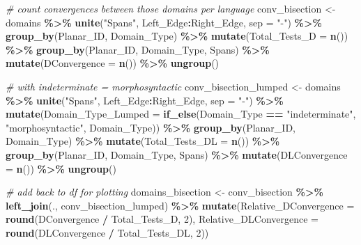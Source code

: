 \documentclass[
]{article}
\newenvironment{Shaded}{\begin{snugshade}}{\end{snugshade}}
\newcommand{\AttributeTok}[1]{\textcolor[rgb]{0.13,0.29,0.53}{#1}}
\newcommand{\CommentTok}[1]{\textcolor[rgb]{0.56,0.35,0.01}{\textit{#1}}}
\newcommand{\DecValTok}[1]{\textcolor[rgb]{0.00,0.00,0.81}{#1}}
\newcommand{\FunctionTok}[1]{\textcolor[rgb]{0.13,0.29,0.53}{\textbf{#1}}}
\newcommand{\NormalTok}[1]{#1}
\newcommand{\OtherTok}[1]{\textcolor[rgb]{0.56,0.35,0.01}{#1}}
\newcommand{\SpecialCharTok}[1]{\textcolor[rgb]{0.81,0.36,0.00}{\textbf{#1}}}
\newcommand{\StringTok}[1]{\textcolor[rgb]{0.31,0.60,0.02}{#1}}
\begin{document}
\begin{Shaded}
\begin{Highlighting}[]
\CommentTok{\# count convergences between those domains per language}
\NormalTok{conv\_bisection }\OtherTok{\textless{}{-}}\NormalTok{ domains }\SpecialCharTok{\%\textgreater{}\%}
  \FunctionTok{unite}\NormalTok{(}\StringTok{"Spans"}\NormalTok{, Left\_Edge}\SpecialCharTok{:}\NormalTok{Right\_Edge, }\AttributeTok{sep =} \StringTok{"{-}"}\NormalTok{) }\SpecialCharTok{\%\textgreater{}\%}
  \FunctionTok{group\_by}\NormalTok{(Planar\_ID, Domain\_Type) }\SpecialCharTok{\%\textgreater{}\%}
  \FunctionTok{mutate}\NormalTok{(}\AttributeTok{Total\_Tests\_D =} \FunctionTok{n}\NormalTok{()) }\SpecialCharTok{\%\textgreater{}\%}
  \FunctionTok{group\_by}\NormalTok{(Planar\_ID, Domain\_Type, Spans) }\SpecialCharTok{\%\textgreater{}\%}
  \FunctionTok{mutate}\NormalTok{(}\AttributeTok{DConvergence =} \FunctionTok{n}\NormalTok{()) }\SpecialCharTok{\%\textgreater{}\%}
  \FunctionTok{ungroup}\NormalTok{()}

\CommentTok{\# with indeterminate = morphosyntactic}
\NormalTok{conv\_bisection\_lumped }\OtherTok{\textless{}{-}}\NormalTok{ domains }\SpecialCharTok{\%\textgreater{}\%}
  \FunctionTok{unite}\NormalTok{(}\StringTok{"Spans"}\NormalTok{, Left\_Edge}\SpecialCharTok{:}\NormalTok{Right\_Edge, }\AttributeTok{sep =} \StringTok{"{-}"}\NormalTok{) }\SpecialCharTok{\%\textgreater{}\%}
  \FunctionTok{mutate}\NormalTok{(}\AttributeTok{Domain\_Type\_Lumped =} \FunctionTok{if\_else}\NormalTok{(Domain\_Type }\SpecialCharTok{==} \StringTok{"indeterminate"}\NormalTok{, }\StringTok{"morphosyntactic"}\NormalTok{, Domain\_Type)) }\SpecialCharTok{\%\textgreater{}\%}
  \FunctionTok{group\_by}\NormalTok{(Planar\_ID, Domain\_Type) }\SpecialCharTok{\%\textgreater{}\%}
  \FunctionTok{mutate}\NormalTok{(}\AttributeTok{Total\_Tests\_DL =} \FunctionTok{n}\NormalTok{()) }\SpecialCharTok{\%\textgreater{}\%}
  \FunctionTok{group\_by}\NormalTok{(Planar\_ID, Domain\_Type, Spans) }\SpecialCharTok{\%\textgreater{}\%}
  \FunctionTok{mutate}\NormalTok{(}\AttributeTok{DLConvergence =} \FunctionTok{n}\NormalTok{()) }\SpecialCharTok{\%\textgreater{}\%}
  \FunctionTok{ungroup}\NormalTok{()}

\CommentTok{\# add back to df for plotting}
\NormalTok{domains\_bisection }\OtherTok{\textless{}{-}}\NormalTok{ conv\_bisection }\SpecialCharTok{\%\textgreater{}\%}
  \FunctionTok{left\_join}\NormalTok{(., conv\_bisection\_lumped) }\SpecialCharTok{\%\textgreater{}\%}
  \FunctionTok{mutate}\NormalTok{(}\AttributeTok{Relative\_DConvergence =} \FunctionTok{round}\NormalTok{(DConvergence }\SpecialCharTok{/}\NormalTok{ Total\_Tests\_D, }\DecValTok{2}\NormalTok{), }\AttributeTok{Relative\_DLConvergence =} \FunctionTok{round}\NormalTok{(DLConvergence }\SpecialCharTok{/}\NormalTok{ Total\_Tests\_DL, }\DecValTok{2}\NormalTok{))}
\end{Highlighting}
\end{Shaded}
\end{document}

